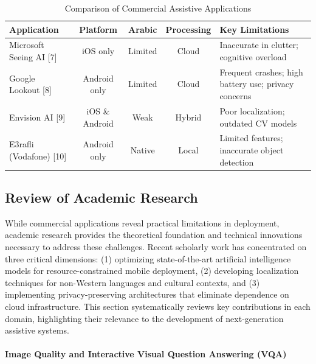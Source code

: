 \documentclass[12pt,a4paper]{report}
\begin{document}
\begin{table}[h]
\centering
\caption{Comparison of Commercial Assistive Applications}
\begin{tabularx}{\textwidth}{|>{\raggedright\arraybackslash}p{}|c|c|c|>{\raggedright\arraybackslash}X|}
\hline
\textbf{Application} & \textbf{Platform} & \textbf{Arabic} & \textbf{Processing} & \textbf{Key Limitations} \\
\hline
Microsoft Seeing AI [7] & iOS only & Limited & Cloud & Inaccurate in clutter; cognitive overload \\
\hline
Google Lookout [8] & Android only & Limited & Cloud & Frequent crashes; high battery use; privacy concerns \\
\hline
Envision AI [9] & iOS \& Android & Weak & Hybrid & Poor localization; outdated CV models \\
\hline
E3rafli (Vodafone) [10] & Android only & Native & Local & Limited features; inaccurate object detection \\
\hline
\end{tabularx}
\end{table}

\subsection{Review of Academic Research}

While commercial applications reveal practical limitations in deployment, academic research provides the theoretical foundation and technical innovations necessary to address these challenges. Recent scholarly work has concentrated on three critical dimensions: (1) optimizing state-of-the-art artificial intelligence models for resource-constrained mobile deployment, (2) developing localization techniques for non-Western languages and cultural contexts, and (3) implementing privacy-preserving architectures that eliminate dependence on cloud infrastructure. This section systematically reviews key contributions in each domain, highlighting their relevance to the development of next-generation assistive systems.

\paragraph*{Image Quality and Interactive Visual Question Answering (VQA)}
\end{document}

